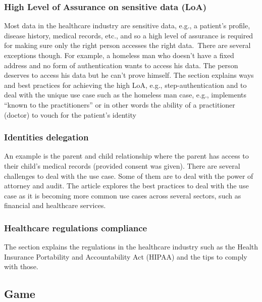\hypertarget{high-level-of-assurance-on-sensitive-data-loa}{%
\subsubsection{High Level of Assurance on sensitive data
(LoA)}\label{high-level-of-assurance-on-sensitive-data-loa}}

Most data in the healthcare industry are sensitive data, e.g., a
patient's profile, disease history, medical records, etc., and so a high
level of assurance is required for making sure only the right person
accesses the right data.~There are several exceptions though. For
example, a homeless man who doesn't have a fixed address and no form of
authentication wants to access his data. The person deserves to access
his data but he can't prove himself. The section explains ways and best
practices for achieving the high LoA, e.g., step-authentication and to
deal with the unique use case such as the homeless man case, e.g.,
implements ``known to the practitioners'' or in other words the ability
of a practitioner (doctor) to vouch for the patient's identity

\hypertarget{identities-delegation}{%
\subsubsection{Identities delegation}\label{identities-delegation}}

An example is the parent and child relationship where the parent has
access to their child's medical records (provided consent was given).
There are several challenges to deal with the use case. Some of them are
to deal with the power of attorney and audit. The article explores the
best practices to deal with the use case as it is becoming more common
use cases across several sectors, such as financial and healthcare
services.

\hypertarget{healthcare-regulations-compliance}{%
\subsubsection{Healthcare regulations
compliance}\label{healthcare-regulations-compliance}}

The section explains the regulations in the healthcare industry such as
the Health Insurance Portability and Accountability Act (HIPAA) and the
tips to comply with those.

\hypertarget{game}{%
\subsection{Game}\label{game}}

